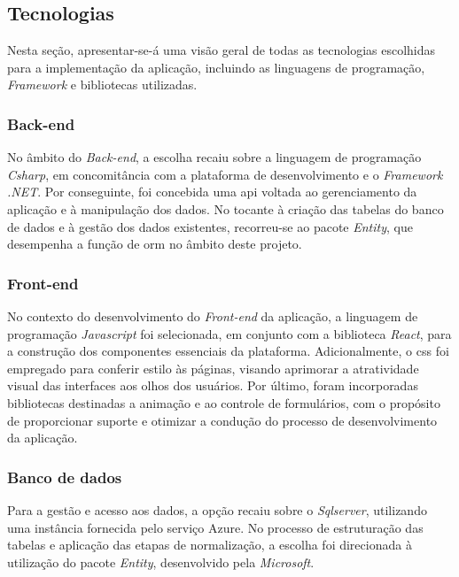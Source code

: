 \subsection{Tecnologias}

Nesta seção, apresentar-se-á uma visão geral de todas as tecnologias escolhidas para a implementação da aplicação, incluindo as linguagens de programação, \textit{\gls{Framework}} e bibliotecas utilizadas.

\subsubsection{Back-end}

No âmbito do \textit{\gls{Back-end}}, a escolha recaiu sobre a linguagem de programação \textit{\gls{Csharp}}, em concomitância com a plataforma de desenvolvimento e o \textit{Framework} \textit{\gls{.NET}}. Por conseguinte, foi concebida uma \ac{api} voltada ao gerenciamento da aplicação e à manipulação dos dados. No tocante à criação das tabelas do banco de dados e à gestão dos dados existentes, recorreu-se ao pacote \textit{\gls{Entity}}, que desempenha a função de \ac{orm} no âmbito deste projeto.

\subsubsection{Front-end}

No contexto do desenvolvimento do \textit{\gls{Front-end}} da aplicação, a linguagem de programação \textit{\gls{Javascript}} foi selecionada, em conjunto com a biblioteca \textit{\gls{React}}, para a construção dos componentes essenciais da plataforma. Adicionalmente, o \ac{css} foi empregado para conferir estilo às páginas, visando aprimorar a atratividade visual das interfaces aos olhos dos usuários. Por último, foram incorporadas bibliotecas destinadas a animação e ao controle de formulários, com o propósito de proporcionar suporte e otimizar a condução do processo de desenvolvimento da aplicação.

\subsubsection{Banco de dados}

Para a gestão e acesso aos dados, a opção recaiu sobre o \textit{\gls{Sqlserver}}, utilizando uma instância fornecida pelo serviço Azure. No processo de estruturação das tabelas e aplicação das etapas de normalização, a escolha foi direcionada à utilização do pacote \textit{\gls{Entity}}, desenvolvido pela \textit{\gls{Microsoft}}.

